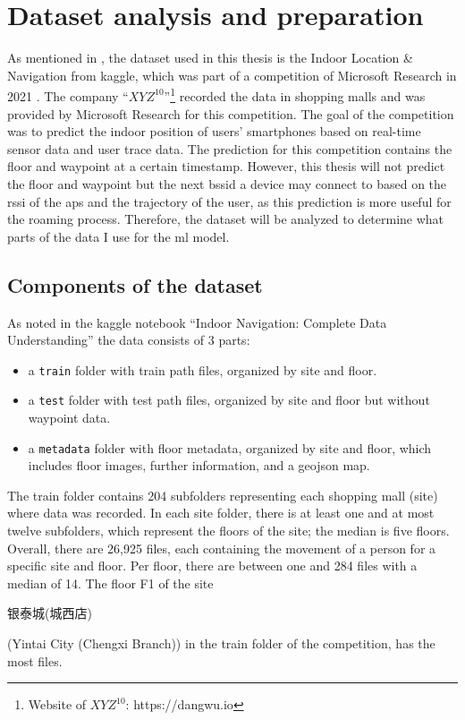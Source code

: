 \chapter{Dataset analysis and preparation}\label{ch:data-ana}

As mentioned in , the dataset used in this thesis is the Indoor Location \& Navigation from kaggle, which was part of a competition of Microsoft Research in 2021 \cite{IndoorLocationNavigation}.
The company ``\(XYZ^{10}\)''\footnote{Website of \(XYZ^{10}\): https://dangwu.io} recorded the data in shopping malls and was provided by Microsoft Research for this competition.
The goal of the competition was to predict the indoor position of users' smartphones based on real-time sensor data and user trace data.
The prediction for this competition contains the floor and waypoint at a certain timestamp.
However, this thesis will not predict the floor and waypoint but the next \ac{bssid} a device may connect to based on the \ac{rssi} of the \acp{ap} and the trajectory of the user, as this prediction is more useful for the roaming process.
Therefore, the dataset will be analyzed to determine what parts of the data I use for the \ac{ml} model.

\section{Components of the dataset}\label{sec:data}
As noted in the kaggle notebook ``Indoor Navigation: Complete Data Understanding'' \cite{IndoorNavigationUnderstanding} the data consists of 3 parts:

\begin{itemize}
    \item a \texttt{train} folder with train path files, organized by site and floor.
    \item a \texttt{test} folder with test path files, organized by site and floor but without waypoint data.
    \item a \texttt{metadata} folder with floor metadata, organized by site and floor, which includes floor images, further information, and a geojson map.
\end{itemize}

The train folder contains 204 subfolders representing each shopping mall (site) where  data was recorded.
In each site folder, there is at least  one and at most twelve subfolders, which represent the floors of the site; the median is five floors.
Overall, there are 26,925 files, each containing the movement of a person for a specific site and floor.
Per floor, there are between one and 284 files with a median of 14.
The floor F1 of the site \begin{CJK*}{UTF8}{gbsn}银泰城(城西店)\end{CJK*} (Yintai City (Chengxi Branch)) in the train folder of the competition, has the most files.

